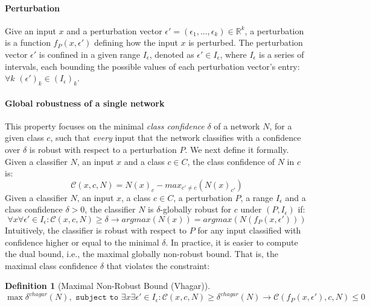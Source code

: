 \documentclass[11pt]{article}
\newtheorem{definition}{Definition}
\begin{document}
\paragraph{Perturbation}
Give an input $x$ and a perturbation vector $\epsilon'=(\epsilon_1,...,\epsilon_k)\in{\mathbb{R}}^{k}$, a perturbation is a function $f_P(x,\epsilon')$ defining how the input $x$ is perturbed. The perturbation vector $\epsilon'$ is confined in a given range $I_\epsilon$, denoted as $\epsilon'\in I_\epsilon$, where $I_\epsilon$ is a series of intervals, each bounding the possible values of each perturbation vector's entry: $\forall{k}$ $(\epsilon')_k\in (I_\epsilon)_k$.

\paragraph{Global robustness of a single network}
This property focuses on the minimal \emph{class confidence} $\delta$ of a network $N$, for a given class $c$, such that \emph{every} input that the network classifies with a confidence over $\delta$ is robust with respect to a perturbation $P$. We next define it formally.
Given a classifier $N$, an input $x$ and a class $c\in{C}$, the class confidence of $N$ in $c$ is:
$$\mathcal{C}(x,c,N)=N(x)_{c}-max_{c'\ne c}(N(x)_{c'})$$
Given a classifier $N$, an input $x$, a class $c\in{C}$, a perturbation $P$, a range $I_\epsilon$ and a class confidence $\delta>0$, the classifier $N$ is $\delta$-globally robust for $c$ under $(P,I_\epsilon)$ if:\\
$$\forall{x}\forall{\epsilon'}\in{I_\epsilon}:    \mathcal{C}(x,c,N) \geq \delta \rightarrow argmax(N(x)) = argmax(N(f_P(x,\epsilon'))) $$
Intuitively, the classifier is robust with respect to $P$ for any input classified with confidence higher or equal to the minimal $\delta$. In practice, it is easier to compute the dual bound, i.e., the maximal globally non-robust bound. That is, the maximal class confidence $\delta$ that violates the constraint:
\begin{definition}[Maximal Non-Robust Bound (Vhagar)]\label{def:vhagar}
$$\max{\delta^{vhagar}(N)}, \texttt{ subject to } \exists{x}\exists{\epsilon'}\in{I_\epsilon}: \mathcal{C}(x,c,N) \geq \delta^{vhagar}(N) \rightarrow \mathcal{C}(f_P(x,\epsilon'),c,N)\leq 0$$
\end{definition}
\end{document}
